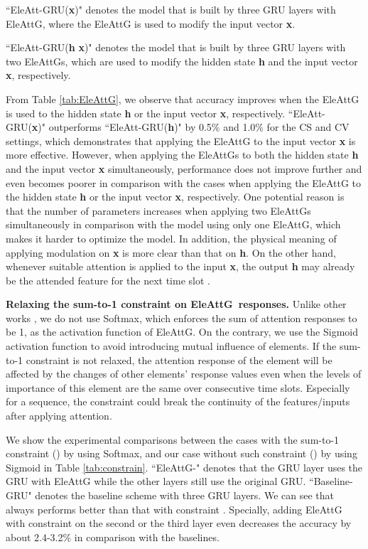 \documentclass[journal]{IEEEtran}
\newcommand{\EleAttG}{{EleAttG~}}
\begin{document}
``EleAtt-GRU(\textbf{x})" denotes the model that is built by three GRU layers with EleAttG, where the EleAttG is used to modify the input vector \textbf{x}. 

``EleAtt-GRU(\textbf{h}  \textbf{x})" denotes the model that is built by three GRU layers with two EleAttGs, which are used to modify the hidden state \textbf{h} and the input vector \textbf{x}, respectively.

From Table \ref{tab:EleAttG}, we observe that accuracy improves when the EleAttG is used to the hidden state \textbf{h} or the input vector \textbf{x}, respectively. ``EleAtt-GRU(\textbf{x})" outperforms ``EleAtt-GRU(\textbf{h})" by 0.5\% and 1.0\% for the CS and CV settings, which demonstrates that applying the EleAttG to the input vector \textbf{x} is more effective. However, when applying the EleAttGs to both the hidden state \textbf{h} and the input vector \textbf{x} simultaneously, performance does not improve further and even becomes poorer in comparison with the cases when applying the EleAttG to the hidden state \textbf{h} or the input vector \textbf{x}, respectively. One potential reason is that the number of parameters increases when applying two EleAttGs simultaneously in comparison with the model using only one EleAttG, which makes it harder to optimize the model. In addition, the physical meaning of applying modulation on \textbf{x} is more clear than that on \textbf{h}. On the other hand, whenever suitable attention is applied to the input \textbf{x}, the output \textbf{h} may already be the attended feature for the next time slot .




\textbf{Relaxing the sum-to-1 constraint on \EleAttG responses.} Unlike other works \cite{xu2015show,song2017end,liu2017global}, we do not use Softmax, which enforces the sum of attention responses to be 1, as the activation function of EleAttG. On the contrary, we use the Sigmoid activation function to avoid introducing  mutual influence of elements. If the sum-to-1 constraint is not relaxed, the attention response of the  element will be affected by the changes of other elements' response values even when the levels of importance of this element are the same over consecutive time slots. Especially for a sequence, the constraint could break the continuity of the features/inputs after applying attention.


We show the experimental comparisons between the cases with the sum-to-1 constraint () by using Softmax, and our case without such constraint () by using Sigmoid in Table \ref{tab:constrain}. ``EleAttG-" denotes that the  GRU layer uses the GRU with EleAttG while the other layers still use the original GRU. ``Baseline-GRU" denotes the baseline scheme with three GRU layers. We can see that  always performs better than that with constraint . Specially, adding EleAttG with constraint on the second or the third layer even decreases the accuracy by about 2.4-3.2\% in comparison with the baselines. 
\end{document}
